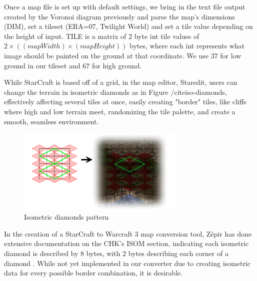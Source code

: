 \documentclass[letterpaper]{article}
\begin{document}
Once a map file is set up with default settings, we bring in the text file output created by the Voronoi diagram previously and parse the map's dimensions (DIM), set a tileset (ERA=07, Twilight World) and set a tile value depending on the height of input. TILE is a matrix of 2 byte int tile values of $2 \times ((mapWidth)  \times (mapHeight))$ bytes, where each int represents what image should be painted on the ground at that coordinate. We use $37$ for low ground in our tileset and $67$ for high ground.

While StarCraft is based off of a grid, in the map editor, Staredit, users can change the terrain in isometric diamonds as in Figure /cite{iso-diamonds}, effectively affecting several tiles at once, easily creating "border" tiles, like cliffs where high and low terrain meet, randomizing the tile palette, and create a smooth, seamless environment.

\begin{figure}[ht]
    \centering
    \includegraphics[width=8cm]{iso-diamonds.png}
    \caption{Isometric diamonds pattern}
    \label{fig:iso-diamonds}
\end{figure}

In the creation of a StarCraft to Warcraft 3 map conversion tool, Z\'{e}pir has done extensive documentation on the CHK's ISOM section, indicating each isometric diamond is described by 8 bytes, with 2 bytes describing each corner of a diamond \cite{Zepir}. While not yet implemented in our converter due to creating isometric data for every possible border combination, it is desirable.
\end{document}

